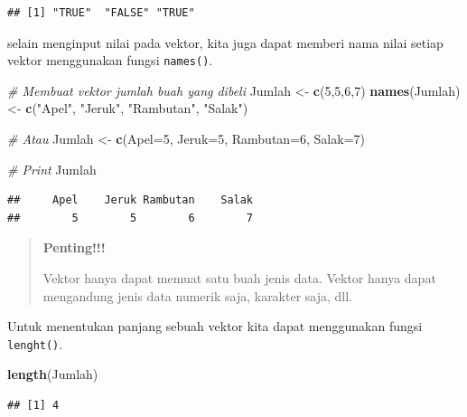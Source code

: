 \documentclass[]{book}
\newenvironment{Shaded}{\begin{snugshade}}{\end{snugshade}}
\newcommand{\CommentTok}[1]{\textcolor[rgb]{0.56,0.35,0.01}{\textit{#1}}}
\newcommand{\DataTypeTok}[1]{\textcolor[rgb]{0.13,0.29,0.53}{#1}}
\newcommand{\DecValTok}[1]{\textcolor[rgb]{0.00,0.00,0.81}{#1}}
\newcommand{\KeywordTok}[1]{\textcolor[rgb]{0.13,0.29,0.53}{\textbf{#1}}}
\newcommand{\NormalTok}[1]{#1}
\newcommand{\StringTok}[1]{\textcolor[rgb]{0.31,0.60,0.02}{#1}}
\theoremstyle{definition}
\theoremstyle{definition}
\theoremstyle{definition}
\theoremstyle{remark}
\begin{document}
\begin{verbatim}
## [1] "TRUE"  "FALSE" "TRUE"
\end{verbatim}

selain menginput nilai pada vektor, kita juga dapat memberi nama nilai setiap vektor menggunakan fungsi \texttt{names()}.

\begin{Shaded}
\begin{Highlighting}[]
\CommentTok{# Membuat vektor jumlah buah yang dibeli}
\NormalTok{Jumlah <-}\StringTok{ }\KeywordTok{c}\NormalTok{(}\DecValTok{5}\NormalTok{,}\DecValTok{5}\NormalTok{,}\DecValTok{6}\NormalTok{,}\DecValTok{7}\NormalTok{)}
\KeywordTok{names}\NormalTok{(Jumlah) <-}\StringTok{ }\KeywordTok{c}\NormalTok{(}\StringTok{"Apel"}\NormalTok{, }\StringTok{"Jeruk"}\NormalTok{, }\StringTok{"Rambutan"}\NormalTok{, }\StringTok{"Salak"}\NormalTok{)}

\CommentTok{# Atau}
\NormalTok{Jumlah <-}\StringTok{ }\KeywordTok{c}\NormalTok{(}\DataTypeTok{Apel=}\DecValTok{5}\NormalTok{, }\DataTypeTok{Jeruk=}\DecValTok{5}\NormalTok{, }\DataTypeTok{Rambutan=}\DecValTok{6}\NormalTok{, }\DataTypeTok{Salak=}\DecValTok{7}\NormalTok{)}

\CommentTok{# Print}
\NormalTok{Jumlah}
\end{Highlighting}
\end{Shaded}

\begin{verbatim}
##     Apel    Jeruk Rambutan    Salak 
##        5        5        6        7
\end{verbatim}

\begin{quote}
\textbf{Penting!!!}

Vektor hanya dapat memuat satu buah jenis data. Vektor hanya dapat mengandung jenis data numerik saja, karakter saja, dll.
\end{quote}

Untuk menentukan panjang sebuah vektor kita dapat menggunakan fungsi \texttt{lenght()}.

\begin{Shaded}
\begin{Highlighting}[]
\KeywordTok{length}\NormalTok{(Jumlah)}
\end{Highlighting}
\end{Shaded}

\begin{verbatim}
## [1] 4
\end{verbatim}
\end{document}

